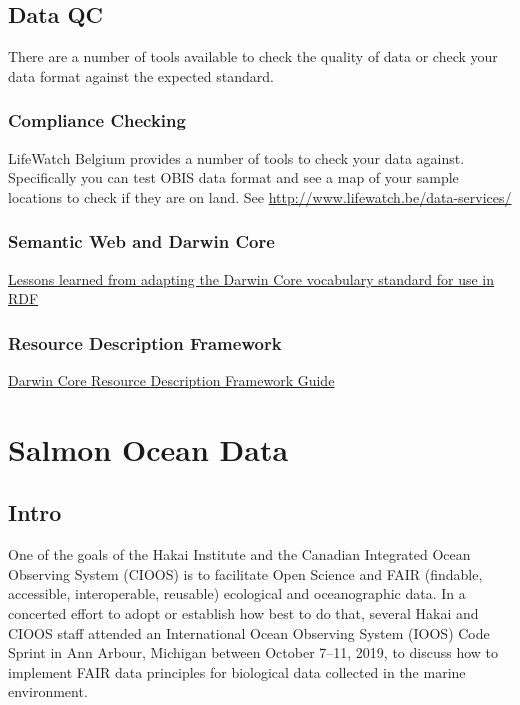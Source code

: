 \documentclass[]{book}
\begin{document}
\hypertarget{data-qc}{%
\section{Data QC}\label{data-qc}}

There are a number of tools available to check the quality of data or check your data format against the expected standard.

\hypertarget{compliance-checking}{%
\subsection{Compliance Checking}\label{compliance-checking}}

LifeWatch Belgium provides a number of tools to check your data against.
Specifically you can test OBIS data format and see a map of your sample locations to check if they are on land.
See \url{http://www.lifewatch.be/data-services/}

\hypertarget{semantic-web-and-darwin-core}{%
\subsection{Semantic Web and Darwin Core}\label{semantic-web-and-darwin-core}}

\href{\%22http://www.semantic-web-journal.net/system/files/swj1093.pdf\%22}{Lessons learned from adapting the Darwin Core vocabulary standard for use in RDF}

\hypertarget{resource-description-framework}{%
\subsection{Resource Description Framework}\label{resource-description-framework}}

\href{\%22https://dwc.tdwg.org/rdf/\%22}{Darwin Core Resource Description Framework Guide}

\hypertarget{salmon-ocean-data}{%
\chapter{Salmon Ocean Data}\label{salmon-ocean-data}}

\hypertarget{intro-1}{%
\section{Intro}\label{intro-1}}

One of the goals of the Hakai Institute and the Canadian Integrated Ocean Observing System (CIOOS) is to facilitate Open Science and FAIR (findable, accessible, interoperable, reusable) ecological and oceanographic data. In a concerted effort to adopt or establish how best to do that, several Hakai and CIOOS staff attended an International Ocean Observing System (IOOS) Code Sprint in Ann Arbour, Michigan between October 7--11, 2019, to discuss how to implement FAIR data principles for biological data collected in the marine environment.
\end{document}
